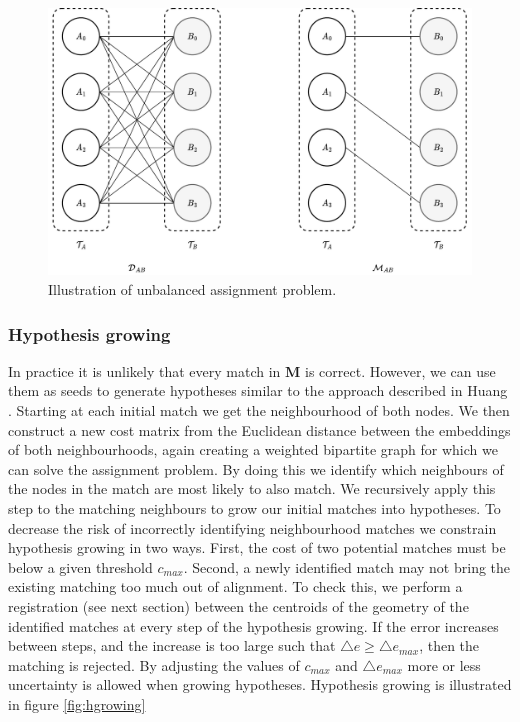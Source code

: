 \begin{figure}[h]
    \centering
    \includegraphics*[width=.9\textwidth]{./fig/assignment.drawio.pdf}
    \caption{Illustration of unbalanced assignment problem.}
    \label{fig:assignment}
\end{figure}

\subsubsection{Hypothesis growing}

In practice it is unlikely that every match in \(\mathbf{M}\) is correct. However, we can use them as seeds to generate hypotheses similar to the approach described in Huang \citep{huang_topological_2005}. Starting at each initial match we get the neighbourhood of both nodes. We then construct a new cost matrix from the Euclidean distance between the embeddings of both neighbourhoods, again creating a weighted bipartite graph for which we can solve the assignment problem. By doing this we identify which neighbours of the nodes in the match are most likely to also match. We recursively apply this step to the matching neighbours to grow our initial matches into hypotheses. To decrease the risk of incorrectly identifying neighbourhood matches we constrain hypothesis growing in two ways. First, the cost of two potential matches must be below a given threshold \(c_{max}\). Second, a newly identified match may not bring the existing matching too much out of alignment. To check this, we perform a registration (see next section) between the centroids of the geometry of the identified matches at every step of the hypothesis growing. If the error increases between steps, and the increase is too large such that \(\triangle e \geq \triangle e_{max} \), then the matching is rejected. By adjusting the values of \(c_{max}\) and \(\triangle e_{max}\) more or less uncertainty is allowed when growing hypotheses. Hypothesis growing is illustrated in figure \ref{fig:hgrowing}

